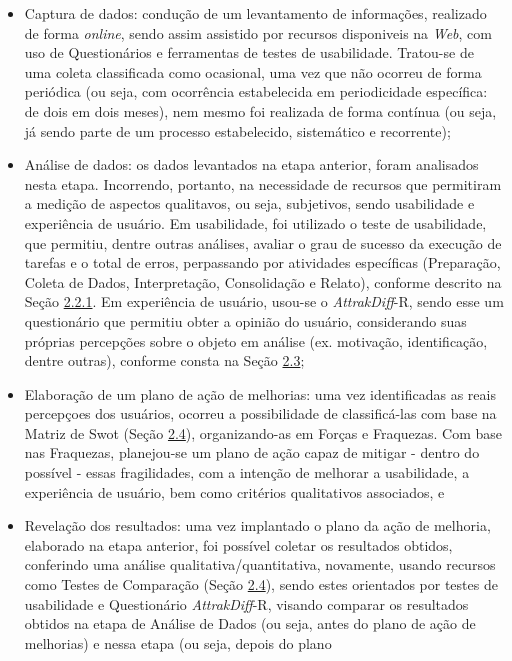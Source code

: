 \begin{itemize}
	\item Captura de dados: condução de um levantamento de informações, realizado de forma \textit{online}, sendo assim assistido por recursos disponiveis na \textit{Web}, com uso de Questionários e ferramentas de testes de usabilidade. Tratou-se de uma coleta classificada como ocasional, uma vez que não ocorreu de forma periódica (ou seja, com ocorrência estabelecida em periodicidade específica: de dois em dois meses), nem mesmo foi realizada de forma contínua (ou seja, já sendo parte de um processo estabelecido, sistemático e recorrente);
	\item Análise de dados: os dados levantados na etapa anterior, foram analisados nesta etapa. Incorrendo, portanto, na necessidade de recursos que permitiram a medição de aspectos qualitavos, ou seja, subjetivos, sendo usabilidade e experiência de usuário. Em usabilidade, foi utilizado o teste de usabilidade, que permitiu, dentre outras análises, avaliar o grau de sucesso da execução de tarefas e o total de erros, perpassando por atividades específicas (Preparação, Coleta de Dados, Interpretação, Consolidação e Relato), conforme 
	descrito na Seção \hyperref[sec:Medição1]{2.2.1}. Em experiência de usuário, usou-se o \textit{AttrakDiff}-R, sendo esse um questionário que permitiu obter a opinião do usuário, considerando suas próprias percepções sobre o objeto em análise (ex. motivação, identificação, dentre outras), conforme consta na Seção \hyperref[sec:Experiencia de Usuario]{2.3};
	\item Elaboração de um plano de ação de melhorias: uma vez identificadas as reais percepçoes dos usuários, ocorreu a possibilidade de classificá-las com base na Matriz de Swot (Seção \hyperref[sec:Teste de Comparação]{2.4}), organizando-as em Forças e Fraquezas. Com base nas Fraquezas, planejou-se um plano de ação capaz de mitigar - dentro do possível - essas fragilidades, com a intenção de melhorar a usabilidade, a experiência de usuário, bem como critérios qualitativos associados, e
	\item Revelação dos resultados: uma vez implantado o plano da ação de melhoria, elaborado na etapa anterior, foi possível coletar os resultados obtidos, conferindo uma análise qualitativa/quantitativa, novamente, usando recursos como Testes de Comparação (Seção \hyperref[sec:Teste de Comparação]{2.4}), sendo estes orientados por testes de usabilidade e Questionário \textit{AttrakDiff}-R, visando comparar os resultados obtidos na etapa de Análise de Dados (ou seja, antes do plano de ação de melhorias) e nessa etapa (ou seja, depois do plano 

\end{itemize}
